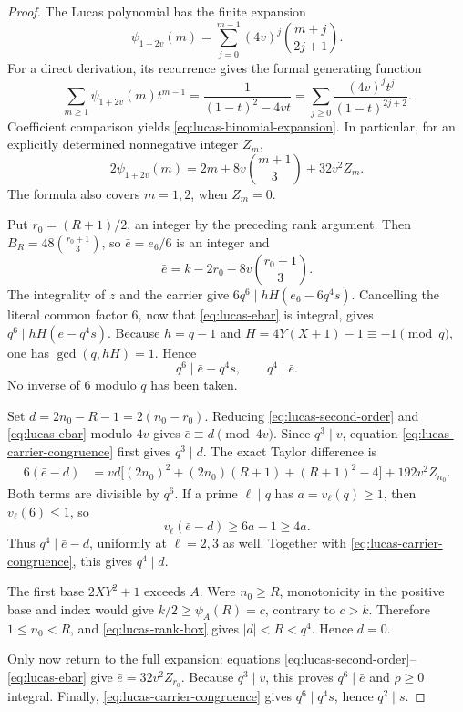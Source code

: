 \begin{proof}
The Lucas polynomial has the finite expansion
\begin{equation}
 \psi_{1+2v}(m)=\sum_{j=0}^{m-1}(4v)^j
                    \binom{m+j}{2j+1}.
 \label{eq:lucas-binomial-expansion}
\end{equation}
For a direct derivation, its recurrence gives the formal generating function
\[
 \sum_{m\ge1}\psi_{1+2v}(m)t^{m-1}
 =\frac1{(1-t)^2-4vt}
 =\sum_{j\ge0}\frac{(4v)^jt^j}{(1-t)^{2j+2}}.
\]
Coefficient comparison yields \eqref{eq:lucas-binomial-expansion}.  In
particular, for an explicitly determined nonnegative integer $Z_m$,
\begin{equation}
 2\psi_{1+2v}(m)
 =2m+8v\binom{m+1}{3}+32v^2Z_m.
 \label{eq:lucas-second-order}
\end{equation}
The formula also covers $m=1,2$, when $Z_m=0$.

Put $r_0=(R+1)/2$, an integer by the preceding rank argument.  Then
$B_R=48\binom{r_0+1}{3}$, so $\bar e=e_6/6$ is an integer and
\begin{equation}
 \bar e=k-2r_0-8v\binom{r_0+1}{3}.
 \label{eq:lucas-ebar}
\end{equation}
The integrality of $z$ and the carrier give
$6q^6\mid hH(e_6-6q^4s)$.  Cancelling the literal common factor $6$,
now that \eqref{eq:lucas-ebar} is integral, gives
$q^6\mid hH(\bar e-q^4s)$.  Because $h=q-1$ and
$H=4Y(X+1)-1\equiv-1\pmod q$, one has $\gcd(q,hH)=1$.  Hence
\begin{equation}
 q^6\mid\bar e-q^4s,\qquad q^4\mid\bar e.
 \label{eq:lucas-carrier-congruence}
\end{equation}
No inverse of $6$ modulo $q$ has been taken.

Set $d=2n_0-R-1=2(n_0-r_0)$.  Reducing
\eqref{eq:lucas-second-order} and \eqref{eq:lucas-ebar} modulo $4v$
gives $\bar e\equiv d\pmod{4v}$.  Since $q^3\mid v$, equation
\eqref{eq:lucas-carrier-congruence} first gives $q^3\mid d$.
The exact Taylor difference is
\begin{align}
 6(\bar e-d)
 &=vd\bigl[(2n_0)^2+(2n_0)(R+1)+(R+1)^2-4\bigr]
       +192v^2Z_{n_0}.
 \label{eq:lucas-taylor-upgrade}
\end{align}
Both terms are divisible by $q^6$.  If a prime $\ell\mid q$ has
$a=v_\ell(q)\ge1$, then $v_\ell(6)\le1$, so
\[
 v_\ell(\bar e-d)\ge6a-1\ge4a.
\]
Thus $q^4\mid\bar e-d$, uniformly at $\ell=2,3$ as well.  Together
with \eqref{eq:lucas-carrier-congruence}, this gives $q^4\mid d$.

The first base $2XY^2+1$ exceeds $A$.  Were $n_0\ge R$, monotonicity
in the positive base and index would give $k/2\ge\psi_A(R)=c$,
contrary to $c>k$.  Therefore $1\le n_0<R$, and
\eqref{eq:lucas-rank-box} gives $|d|<R<q^4$.  Hence $d=0$.

Only now return to the full expansion: equations
\eqref{eq:lucas-second-order}--\eqref{eq:lucas-ebar} give
$\bar e=32v^2Z_{r_0}$.  Because $q^3\mid v$, this proves
$q^6\mid\bar e$ and $\rho\ge0$ integral.  Finally,
\eqref{eq:lucas-carrier-congruence} gives $q^6\mid q^4s$, hence
$q^2\mid s$.
\end{proof}

